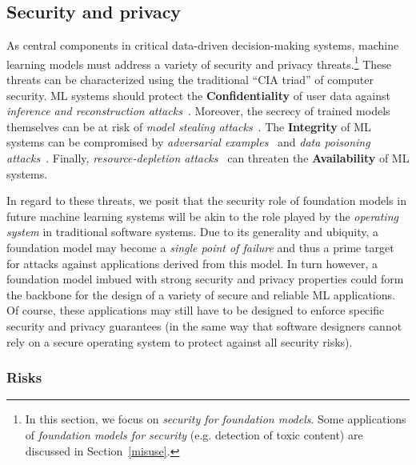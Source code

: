 \newsection
\subsection{Security and privacy}
\label{sec:security}

As central components in critical data-driven decision-making systems, machine learning models must address a variety of security and privacy threats.\footnote{In this section, we focus on \emph{security for foundation models}. Some applications of \emph{foundation models for security} (e.g. detection of toxic content) are discussed in Section~\ref{misuse}.} These threats can be characterized using the traditional ``CIA triad'' of computer security. ML systems should protect the \textbf{Confidentiality} of user data against \emph{inference and reconstruction attacks}~\citep{fredrikson2015model,shokri2017membership, carlini2019secret, carlini2020extracting}. Moreover, the secrecy of trained models themselves can be at risk of \emph{model stealing attacks}~\citep{tramer2016stealing, papernot2017blackbox}. The \textbf{Integrity} of ML systems can be compromised by \emph{adversarial examples}~\citep{biggio2013evasion, szegedy2014intriguing} and \emph{data poisoning attacks}~\citep{biggio2012poisoning, chen2017targeted}. Finally, \emph{resource-depletion attacks}~\citep{shumailov2020sponge,hong2020panda} can threaten the \textbf{Availability} of ML systems.

In regard to these threats, we posit that the security role of foundation models in future machine learning systems will be akin to the role played by the \emph{operating system} in traditional software systems. Due to its generality and ubiquity, a foundation model may become a \emph{single point of failure} and thus a prime target for attacks against applications derived from this model. In turn however, a foundation model imbued with strong security and privacy properties could form the backbone for the design of a variety of secure and reliable ML applications. Of course, these applications may still have to be designed to enforce specific security and privacy guarantees (in the same way that software designers cannot rely on a secure operating system to protect against all security risks).

\subsubsection{Risks}
